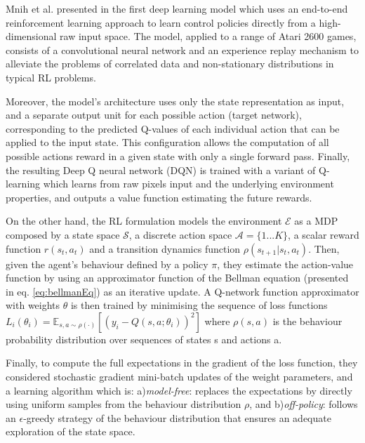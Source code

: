 Mnih et al. presented in \cite{mnih2013playing} \cite{mnih2015human} the first deep learning model which uses an end-to-end reinforcement learning approach to learn control policies directly from a high-dimensional raw input space. The model, applied to a range of Atari 2600 games, consists of a convolutional neural network and an experience replay mechanism\cite{adam2012experience} to alleviate the problems of correlated data and non-stationary distributions in typical RL problems. 

Moreover, the model's architecture uses only the state representation as input, and a separate output unit for each possible action (target network), corresponding to the predicted Q-values of each individual action that can be applied to the input state. This configuration allows the computation of all possible actions reward in a given state with only a single forward pass. Finally, the resulting Deep Q neural network (DQN) is trained with a variant of Q-learning which learns from raw pixels input and the underlying environment properties, and outputs a value function estimating the future rewards.

On the other hand, the RL formulation models the environment $\mathcal{E}$ as a MDP composed by a state space $\mathcal{S}$, a discrete action space $\mathcal{A}=\{1...K\}$, a scalar reward function $r(s_t, a_t)$ and a transition dynamics function $\rho(s_{t+1}|s_t, a_t)$. Then, given the agent's behaviour defined by a policy $\pi$, they estimate the action-value function by using an approximator function of the Bellman equation (presented in eq. \ref{eq:bellmanEq}) as an iterative update. A Q-network function approximator with weights $\theta$ is then trained by minimising the sequence of loss functions $L_i(\theta_i) = \mathbb{E}_{s, a \sim \rho (\cdot)}[(y_i - Q(s, a; \theta_i))^2]$ where $\rho(s, a)$ is the behaviour probability distribution over sequences of states s and actions a.

Finally, to compute the full expectations in the gradient of the loss function, they considered stochastic gradient mini-batch updates of the weight parameters, and a learning algorithm which is: a)\textit{model-free}: replaces the expectations by directly using uniform samples from the behaviour distribution $\rho$, and b)\textit{off-policy}: follows an $\epsilon$-greedy strategy of the behaviour distribution that ensures an adequate exploration of the state space.

